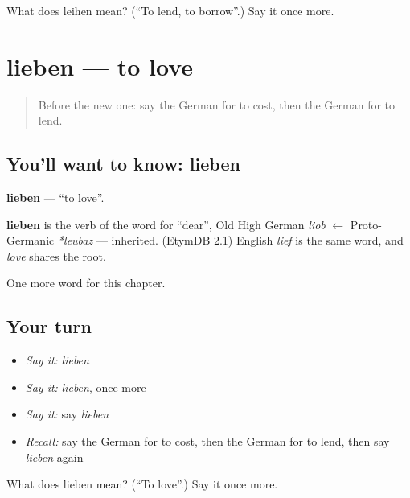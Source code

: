 \begin{tcolorbox}[breakable,colback=teal!4,colframe=teal!35!black,title={Before you move on}]
What does leihen mean? (\textquotedblleft{}To lend, to borrow\textquotedblright{}.) Say it once more.
\end{tcolorbox}
\section[lieben]{lieben — to love}

\label{lesson:GE-C148-lieben}



\begin{quote}
Before the new one: say the German for to cost, then the German for to lend.
\end{quote}

\subsection*{You'll want to know: lieben}
\textbf{lieben} — \textquotedblleft{}to love\textquotedblright{}.

\begin{cousinweb}
\textbf{lieben} is the verb of the word for \textquotedblleft{}dear\textquotedblright{}, Old High German \emph{liob} $\leftarrow$ Proto-Germanic \emph{*leubaz} — inherited. (EtymDB 2.1) English \emph{lief} is the same word, and \emph{love} shares the root.
\end{cousinweb}

\begin{grammarlens}[title={What you've built}]
One more word for this chapter.
\end{grammarlens}

\subsection*{Your turn}
\begin{itemize}
\raggedright
  \item \emph{Say it:} \emph{lieben}
  \item \emph{Say it:} \emph{lieben}, once more
  \item \emph{Say it:} say \emph{lieben}
  \item \emph{Recall:} say the German for to cost, then the German for to lend, then say \emph{lieben} again
\end{itemize}

\begin{tcolorbox}[breakable,colback=teal!4,colframe=teal!35!black,title={Before you move on}]
What does lieben mean? (\textquotedblleft{}To love\textquotedblright{}.) Say it once more.
\end{tcolorbox}
